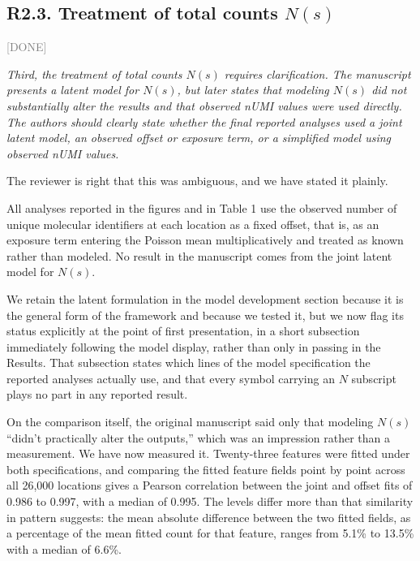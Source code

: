\documentclass[11pt]{article}
\newcommand{\status}[1]{\textcolor{gray}{\small\textsf{[#1]}}}
\newenvironment{rev}{\begin{leftbar}\itshape\small}{\end{leftbar}}
\begin{document}
\subsection{R2.3. Treatment of total counts $N(s)$} \status{DONE}

\begin{rev}
Third, the treatment of total counts $N(s)$ requires clarification. The manuscript
presents a latent model for $N(s)$, but later states that modeling $N(s)$ did not
substantially alter the results and that observed nUMI values were used directly. The
authors should clearly state whether the final reported analyses used a joint latent
model, an observed offset or exposure term, or a simplified model using observed nUMI
values.
\end{rev}

\noindent The reviewer is right that this was ambiguous, and we have stated it plainly.

All analyses reported in the figures and in Table 1 use the observed number of unique
molecular identifiers at each location as a fixed offset, that is, as an exposure term
entering the Poisson mean multiplicatively and treated as known rather than modeled. No
result in the manuscript comes from the joint latent model for $N(s)$.

We retain the latent formulation in the model development section because it is the
general form of the framework and because we tested it, but we now flag its status
explicitly at the point of first presentation, in a short subsection immediately following
the model display, rather than only in passing in the Results. That subsection states which
lines of the model specification the reported analyses actually use, and that every symbol
carrying an $N$ subscript plays no part in any reported result.

On the comparison itself, the original manuscript said only that modeling $N(s)$ ``didn't
practically alter the outputs,'' which was an impression rather than a measurement. We have
now measured it. Twenty-three features were fitted under both specifications, and comparing
the fitted feature fields point by point across all 26,000 locations gives a Pearson
correlation between the joint and offset fits of 0.986 to 0.997, with a median of 0.995. The
levels differ more than that similarity in pattern suggests: the mean absolute difference
between the two fitted fields, as a percentage of the mean fitted count for that feature,
ranges from 5.1\% to 13.5\% with a median of 6.6\%.
\end{document}
